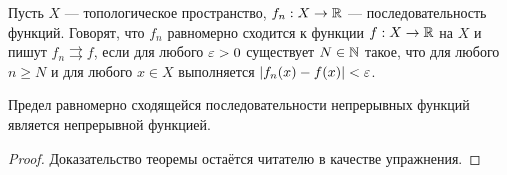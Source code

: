 \begin{definition}
    Пусть $X$ --- топологическое пространство, $f_n: X \rightarrow \mathbb{R}$ --- последовательность функций.
    Говорят, что $f_n$ равномерно сходится к функции $f: X \to \mathbb{R}$ на $X$ и пишут $f_n \rightrightarrows f$, если для любого $\varepsilon > 0$ существует $N \in \mathbb{N}$ такое, что для любого $n \geq N$ и для любого $x \in X$ выполняется $|f_n(x) - f(x)| < \varepsilon$.
\end{definition}

\begin{theorem}
    Предел равномерно сходящейся последовательности непрерывных функций является непрерывной функцией.
\end{theorem}
\begin{proof}
    Доказательство теоремы остаётся читателю в качестве упражнения.
\end{proof}